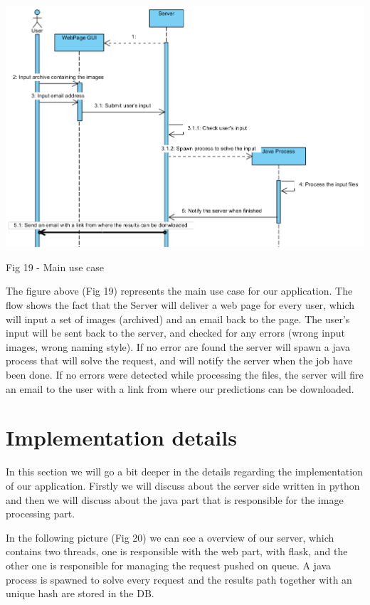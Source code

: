 \documentclass[12pt, a4paper]{report}
\begin{document}
\bigskip
\includegraphics[scale=0.7, center]{FlowCase.png}
\begin{center}
Fig 19 - Main use case
\end{center}
\par 

The figure above (Fig 19) represents the main use case for our application. The flow shows the fact that the Server will deliver a web page for every user, which will input a set of images (archived) and an email back to the page. The user's input will be sent back to the server, and checked for any errors (wrong input images, wrong naming style). If no error are found the server will spawn a java process that will solve the request, and will notify the server when the job have been done. If no errors were detected while processing the files, the server will fire an email to the user with a link from where our predictions can be downloaded.


\section{Implementation details}
\quad
In this section we will go a bit deeper in the details regarding the implementation of our application. Firstly we will discuss about the server side written in python and then we will discuss about the java part that is responsible for the image processing part.
\par 

In the following picture (Fig 20) we can see a overview of our server, which contains two threads, one is responsible with the web part, with flask, and the other one is responsible for managing the request pushed on queue. A java process is spawned to solve every request and the results path together with an unique hash are stored in the DB.
\par 
\end{document}
